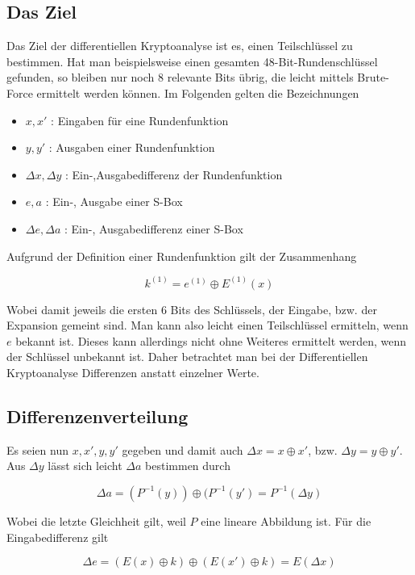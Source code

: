 \documentclass[
10pt, %
a4paper, %
oneside, %
headinclude,footinclude, %
BCOR5mm, %
]{scrartcl}
\begin{document}
\begin{1}[ht]
	\subsection{Das Ziel}
	Das Ziel der differentiellen Kryptoanalyse ist es, einen Teilschlüssel zu bestimmen. Hat man beispielsweise einen gesamten 48-Bit-Rundenschlüssel gefunden, so bleiben nur noch 8 relevante Bits übrig, die leicht mittels Brute-Force ermittelt werden können. \cite[153]{3} Im Folgenden gelten die Bezeichnungen

	\begin{itemize}
	\item $x,x'$ : Eingaben für eine Rundenfunktion
	\item $y,y'$ : Ausgaben einer Rundenfunktion
	\item $\Delta x, \Delta y$ : Ein-,Ausgabedifferenz der Rundenfunktion
	\item $e, a$ : Ein-, Ausgabe einer S-Box
	\item $\Delta e, \Delta a$ : Ein-, Ausgabedifferenz einer S-Box
	\end{itemize}

	Aufgrund der Definition einer Rundenfunktion gilt der Zusammenhang
	
	\begin{equation}
		k^{(1)} = e^{(1)} \oplus E^{(1)}(x)  
	\label{eq:key}
	\end{equation}

	Wobei damit jeweils die ersten 6 Bits des Schlüssels, der Eingabe, bzw. der Expansion gemeint sind. Man kann also leicht einen Teilschlüssel ermitteln, wenn $e$ bekannt ist. Dieses kann allerdings nicht ohne Weiteres ermittelt werden, wenn der Schlüssel unbekannt ist. Daher betrachtet man bei der Differentiellen Kryptoanalyse Differenzen anstatt einzelner Werte.

	\subsection{Differenzenverteilung}
	Es seien nun $x,x',y,y'$ gegeben und damit auch $\Delta x = x \oplus x'$, bzw. $\Delta y = y \oplus y'$. Aus $\Delta y$ lässt sich leicht $\Delta a$ bestimmen durch

	$$ \Delta a = (P^{-1}(y)) \oplus (P^{-1}(y') = P^{-1} (\Delta y) $$

	Wobei die letzte Gleichheit gilt, weil $P$ eine lineare Abbildung ist. \cite[160]{3} Für die Eingabedifferenz gilt

	$$ \Delta e = (E(x) \oplus k) \oplus (E(x') \oplus k) = E(\Delta x) $$


\end{1}
\end{document}
